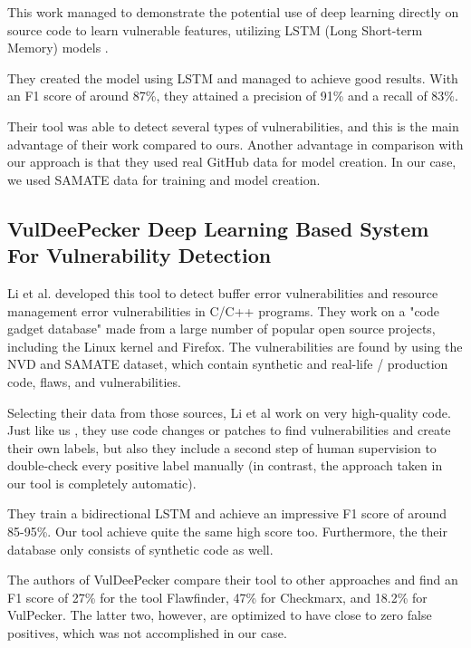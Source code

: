 This work managed to demonstrate the potential use of deep learning directly on source code to learn vulnerable features, utilizing LSTM (Long Short-term Memory) models \cite{article_LSTM}.

They created the model using LSTM and managed to achieve good results. With an F1 score of around 87\%, they attained a precision of 91\% and a recall of 83\%.

Their tool was able to detect several types of vulnerabilities, and this is the main advantage of their work compared to ours. Another advantage in comparison with our approach is that they used real GitHub data for model creation. In our case, we used SAMATE data for training and model creation.




\subsection{VulDeePecker Deep Learning Based System For Vulnerability Detection} %
\label{sub:related_work_VulDeePeckerADeep}

Li et al. \cite{Zhen_Li2018} developed this tool  to detect buffer error vulnerabilities and resource management error vulnerabilities in C/C++ programs. They work on a "code gadget database" made from a large number of popular open source projects, including the Linux kernel and Firefox. The vulnerabilities are found by using the NVD and SAMATE dataset, which contain synthetic and real-life / production code, flaws, and vulnerabilities.

Selecting their data from those sources, Li et al work on very high-quality code. Just like us , they use code changes or patches to find vulnerabilities and create their own labels, but also they include a second step of human supervision to double-check every positive label manually (in contrast, the approach taken in our tool is completely automatic).


They train a bidirectional LSTM and achieve an impressive F1 score of around 85-95\%. Our tool achieve quite the same high score too. Furthermore, the their database only consists of synthetic code as well.

The authors of VulDeePecker compare their tool to other approaches and find an F1 score of 27\% for the tool Flawfinder, 47\% for Checkmarx, and 18.2\% for VulPecker. The latter two, however, are optimized to have close to zero false positives, which was not accomplished in our case.

